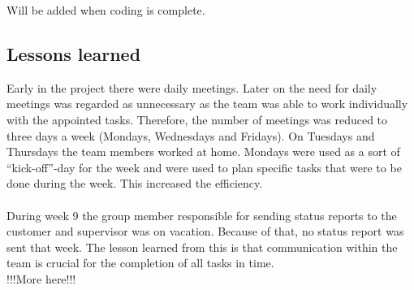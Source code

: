 Will be added when coding is complete.

\subsection{Lessons learned}

Early in the project there were daily meetings. Later on the need for daily meetings was regarded as unnecessary as the team was able to work individually with the appointed tasks. Therefore, the number of meetings was reduced to three days a week (Mondays, Wednesdays and Fridays). On Tuesdays and Thursdays the team members worked at home. Mondays were used as a sort of “kick-off”-day for the week and were used to plan specific tasks that were to be done during the week. This increased the efficiency.\\
\\
During week 9 the group member responsible for sending status reports to the customer and supervisor was on vacation. Because of that, no status report was sent that week. The lesson learned from this is that communication within the team is crucial for the completion of all tasks in time.\\

!!!More here!!!
